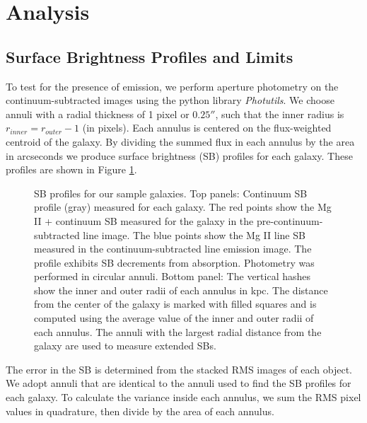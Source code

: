 \documentclass[trackchanges,twocolumn]{aastex62}
\begin{document}
\section{Analysis} \label{sec:analysis}

\subsection{Surface Brightness Profiles and Limits}\label{sec.sb}
To test for the presence of  emission, we perform aperture photometry on the continuum-subtracted images using the python library \emph{Photutils}. We choose annuli with a radial thickness of 1 pixel or $0.25 ''$, such that the inner radius is $r_{inner}=r_{outer}-1$ (in pixels). Each annulus is centered on the flux-weighted centroid of the galaxy. By dividing the summed flux in each annulus by the area in arcseconds we produce surface brightness (SB) profiles for each galaxy. These profiles are shown in Figure \ref{fig:sb_profiles}. 

\begin{figure}
\centering
{}
\caption{SB profiles for our sample galaxies. Top panels: Continuum SB profile (gray) measured for each galaxy. The red points show the Mg II + continuum SB measured for the galaxy in the pre-continuum-subtracted line image. The blue points show the Mg II line SB measured  in the continuum-subtracted line emission image.  The profile exhibits SB decrements from  absorption. Photometry was performed in circular annuli. Bottom panel: The vertical hashes show the inner and outer radii of each annulus in kpc. The distance from the center of the galaxy is marked with filled squares and is computed using the average value of the inner and outer radii of each annulus. The annuli with the largest radial distance from the galaxy are used to measure extended SBs.}
\label{fig:sb_profiles}
\end{figure}

The error in the SB is determined from the stacked RMS images of each object.  We adopt annuli that are identical to the annuli used to find the SB profiles for each galaxy. To calculate the variance inside each annulus, we sum the RMS pixel values in quadrature, then divide by the area of each annulus. 
\end{document}
